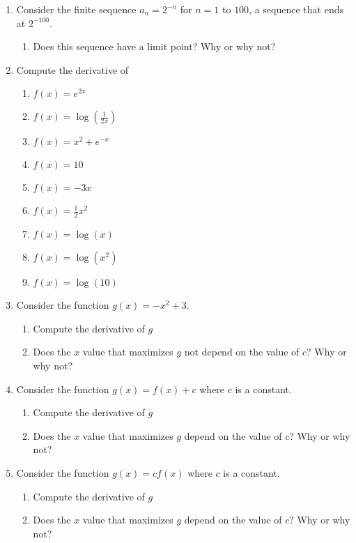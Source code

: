 \begin{enumerate}
    \item Consider the finite sequence $a_{n} = 2^{-n}$ for $n=1$ to $100$, a sequence that ends at $2^{-100}$. 
    \begin{enumerate}
        \item Does this sequence have a limit point? Why or why not?
    \end{enumerate}
    
    \item Compute the derivative of 
    \begin{enumerate}
        \item $f(x) = e^{2x}$
        \item $f(x) = \log(\frac{1}{2x})$
        \item $f(x) = x^{2} + e^{-x}$
        \item $f(x) = 10$
        \item $f(x) = -3x$
        \item $f(x) = \frac{1}{2}x^{2}$
        \item $f(x) = \log(x)$
        \item $f(x) = \log(x^{2})$
        \item $f(x) = \log(10)$
    \end{enumerate}
    
    \item Consider the function $g(x) = -x^{2} + 3$. 
    \begin{enumerate}
        \item Compute the derivative of $g$
        \item Does the $x$ value that maximizes $g$ not depend on the value of $c$? Why or why not?
    \end{enumerate}

    \item Consider the function $g(x) = f(x) + c$ where $c$ is a constant. 
    \begin{enumerate}
        \item Compute the derivative of $g$
        \item Does the $x$ value that maximizes $g$ depend on the value of $c$? Why or why not?
    \end{enumerate}

    \item Consider the function $g(x) = cf(x)$ where $c$ is a constant. 
    \begin{enumerate}
        \item Compute the derivative of $g$
        \item Does the $x$ value that maximizes $g$ depend on the value of $c$? Why or why not?
    \end{enumerate}


\end{enumerate}
